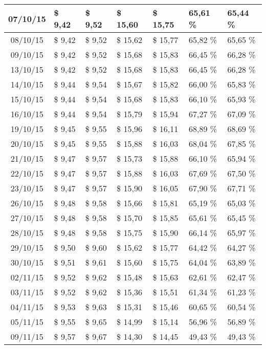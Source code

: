 \begin{center}
\begin{longtable}{|c|p{1.5cm}|p{1.5cm}|p{1.5cm}|p{1.5cm}|p{1.5cm}|p{1.5cm}|}
07/10/15 & \$ 9,42 & \$ 9,52 & \$ 15,60 & \$ 15,75 & 65,61 \% & 65,44 \% \\ \hline
08/10/15 & \$ 9,42 & \$ 9,52 & \$ 15,62 & \$ 15,77 & 65,82 \% & 65,65 \% \\ \hline
09/10/15 & \$ 9,42 & \$ 9,52 & \$ 15,68 & \$ 15,83 & 66,45 \% & 66,28 \% \\ \hline
13/10/15 & \$ 9,42 & \$ 9,52 & \$ 15,68 & \$ 15,83 & 66,45 \% & 66,28 \% \\ \hline
14/10/15 & \$ 9,44 & \$ 9,54 & \$ 15,67 & \$ 15,82 & 66,00 \% & 65,83 \% \\ \hline
15/10/15 & \$ 9,44 & \$ 9,54 & \$ 15,68 & \$ 15,83 & 66,10 \% & 65,93 \% \\ \hline
16/10/15 & \$ 9,44 & \$ 9,54 & \$ 15,79 & \$ 15,94 & 67,27 \% & 67,09 \% \\ \hline
19/10/15 & \$ 9,45 & \$ 9,55 & \$ 15,96 & \$ 16,11 & 68,89 \% & 68,69 \% \\ \hline
20/10/15 & \$ 9,45 & \$ 9,55 & \$ 15,88 & \$ 16,03 & 68,04 \% & 67,85 \% \\ \hline
21/10/15 & \$ 9,47 & \$ 9,57 & \$ 15,73 & \$ 15,88 & 66,10 \% & 65,94 \% \\ \hline
22/10/15 & \$ 9,47 & \$ 9,57 & \$ 15,88 & \$ 16,03 & 67,69 \% & 67,50 \% \\ \hline
23/10/15 & \$ 9,47 & \$ 9,57 & \$ 15,90 & \$ 16,05 & 67,90 \% & 67,71 \% \\ \hline
26/10/15 & \$ 9,48 & \$ 9,58 & \$ 15,66 & \$ 15,81 & 65,19 \% & 65,03 \% \\ \hline
27/10/15 & \$ 9,48 & \$ 9,58 & \$ 15,70 & \$ 15,85 & 65,61 \% & 65,45 \% \\ \hline
28/10/15 & \$ 9,48 & \$ 9,58 & \$ 15,75 & \$ 15,90 & 66,14 \% & 65,97 \% \\ \hline
29/10/15 & \$ 9,50 & \$ 9,60 & \$ 15,62 & \$ 15,77 & 64,42 \% & 64,27 \% \\ \hline
30/10/15 & \$ 9,51 & \$ 9,61 & \$ 15,60 & \$ 15,75 & 64,04 \% & 63,89 \% \\ \hline
02/11/15 & \$ 9,52 & \$ 9,62 & \$ 15,48 & \$ 15,63 & 62,61 \% & 62,47 \% \\ \hline
03/11/15 & \$ 9,52 & \$ 9,62 & \$ 15,36 & \$ 15,51 & 61,34 \% & 61,23 \% \\ \hline
04/11/15 & \$ 9,53 & \$ 9,63 & \$ 15,31 & \$ 15,46 & 60,65 \% & 60,54 \% \\ \hline
05/11/15 & \$ 9,55 & \$ 9,65 & \$ 14,99 & \$ 15,14 & 56,96 \% & 56,89 \% \\ \hline
09/11/15 & \$ 9,57 & \$ 9,67 & \$ 14,30 & \$ 14,45 & 49,43 \% & 49,43 \% \\ \hline

\end{longtable}
\end{center}
